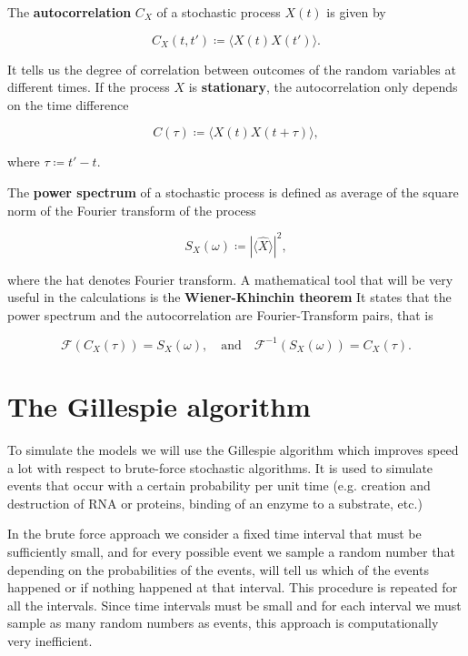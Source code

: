 The \textbf{autocorrelation} $C_X$ of a stochastic process $X(t)$ is given by

\begin{equation}
  C_X(t,t') \coloneqq \langle X(t)X(t')\rangle.
\end{equation}

It tells us the degree of correlation between outcomes of the random variables at different times. If the process $X$ is \textbf{stationary}, the autocorrelation only depends on the time difference

\begin{equation}
  C(\tau) \coloneqq \langle X(t)X(t+\tau)\rangle,
\end{equation}

where $\tau \coloneqq t'-t$.

The \textbf{power spectrum} of a stochastic process is defined as average of the square norm of the Fourier transform of the process

\begin{equation}
  S_X(\omega) \coloneqq \left|\langle\hat X\rangle\right|^2,
\end{equation}

where the hat denotes Fourier transform. A mathematical tool that will be very useful in the calculations is the \textbf{Wiener-Khinchin theorem} It states that the power spectrum and the autocorrelation are Fourier-Transform pairs, that is

\begin{equation}
  \mathscr{F}(C_X(\tau)) = S_X(\omega),\quad\text{and}\quad \mathscr{F}^{-1}(S_X(\omega)) = C_X(\tau).
\end{equation}

\section{The Gillespie algorithm}

To simulate the models we will use the Gillespie algorithm \cite{gillespie77} which improves speed a lot with respect to brute-force stochastic algorithms. It is used to simulate events that occur with a certain probability per unit time (e.g. creation and destruction of RNA or proteins, binding of an enzyme to a substrate, etc.)

In the brute force approach we consider a fixed time interval that must be sufficiently small, and for every possible event we sample a random number that depending on the probabilities of the events, will tell us which of the events happened or if nothing happened at that interval. This procedure is repeated for all the intervals. Since time intervals must be small and for each interval we must sample as many random numbers as events, this approach is computationally very inefficient.

